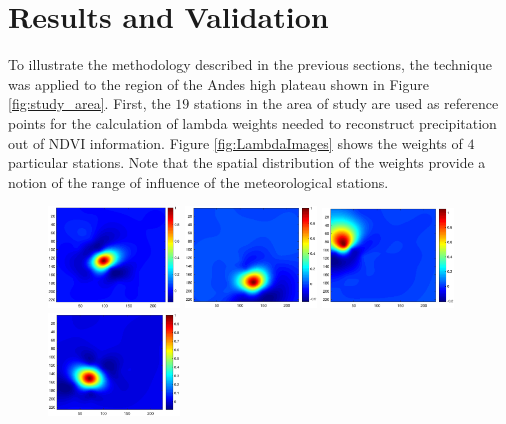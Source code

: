 \documentclass[10pt,letterpaper,conference]{ieeeconf}
\begin{document}
\section{Results and Validation} 

To illustrate the methodology described in the previous sections, the technique 
was applied to the region of the Andes high plateau shown in Figure 
\ref{fig:study_area}. First, the $19$ stations in the area of study are used as 
reference points for the calculation of lambda weights needed to reconstruct 
precipitation out of NDVI information. Figure \ref{fig:LambdaImages} shows the 
weights of $4$ particular stations. Note that the spatial distribution 
of the weights provide a notion of the range of influence of the meteorological 
stations. 
\begin{figure}[ht]
\begce
\includegraphics[width=3.5cm]{AreaweightArapa}
\includegraphics[width=3.5cm]{AreaweightCapachica}
\includegraphics[width=3.5cm]{AreaweightChuquibambilla}
\includegraphics[width=3.5cm]{AreaweightLampa}\\

\end{figure}
\end{document}
